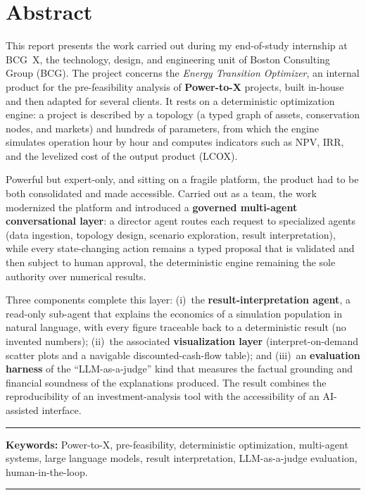 \chapter*{Abstract}

This report presents the work carried out during my end-of-study internship at
BCG~X, the technology, design, and engineering unit of Boston Consulting Group
(BCG). The
project concerns the \textit{Energy Transition Optimizer}, an internal product
for the pre-feasibility analysis of \textbf{Power-to-X} projects, built in-house and then adapted for several clients. It
rests on a deterministic optimization engine: a project is described by a
topology (a typed graph of assets, conservation nodes, and markets) and hundreds
of parameters, from which the engine simulates operation hour by hour and
computes indicators such as NPV, IRR, and the levelized cost of the output
product (LCOX).

Powerful but expert-only, and sitting on a fragile platform, the product had to
be both consolidated and made accessible. Carried out as a team, the work
modernized the platform and introduced a \textbf{governed multi-agent
conversational layer}: a director agent routes each request to specialized
agents (data ingestion, topology design, scenario exploration, result
interpretation), while every state-changing action remains a typed proposal that
is validated and then subject to human approval, the deterministic engine
remaining the sole authority over numerical results.

Three components complete this layer: (i)~the
\textbf{result-interpretation agent}, a read-only sub-agent that explains the
economics of a simulation population in natural language, with every figure
traceable back to a deterministic result (no invented numbers); (ii)~the
associated \textbf{visualization layer} (interpret-on-demand scatter plots and a
navigable discounted-cash-flow table); and (iii)~an \textbf{evaluation harness}
of the ``LLM-as-a-judge'' kind that measures the factual grounding and financial
soundness of the explanations produced. The result combines the reproducibility
of an investment-analysis tool with the accessibility of an AI-assisted
interface.

\noindent\rule[2pt]{\textwidth}{0.5pt}

{\textbf{Keywords:}}
Power-to-X, pre-feasibility, deterministic optimization, multi-agent systems,
large language models, result interpretation, LLM-as-a-judge evaluation,
human-in-the-loop.
\\
\noindent\rule[2pt]{\textwidth}{0.5pt}
